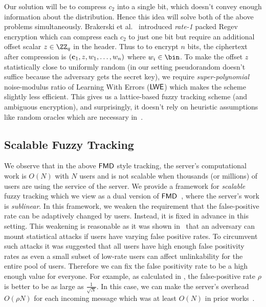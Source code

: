 Our solution will be to compress $c_2$ into a single bit, which doesn't convey enough information about the distribution. Hence this idea will solve both of the above problems simultaneously. Brakerski et al.~\cite{TCC:BDGM19} introduced \emph{rate-1} packed Regev encryption which can compress each $c_2$ to just one bit but require an additional offset scalar $z\in\ZZ_q$ in the header. Thus to to encrypt $n$ bits, the ciphertext after compression is $(\mathbf{c}_1,z,w_1,\dots,w_n)$ where $w_i\in\bin$.
To make the offset $z$ statistically close to uniformly random (in our setting pseudorandom doesn't suffice because the adversary gets the secret key), we require \emph{super-polynomial} noise-modulus ratio of Learning With Errors ($\mathsf{LWE}$)\cite{STOC:Regev05} which makes the scheme slightly less efficient. 
This gives us a lattice-based fuzzy tracking scheme (and ambiguous encryption), and surprisingly, it doesn't rely on heuristic assumptions like random oracles which are necessary in~\cite{CCS:BLMG21}. 


\subsection{Scalable Fuzzy Tracking}
\label{sec:tech_scalable_fuzzy}
We observe that in the above $\mathsf{FMD}$ style tracking, the server's computational work is $O(N)$ with $N$ users and is not scalable when thousands (or millions) of users are using the service of the server.
We provide a framework for \emph{scalable} fuzzy tracking which we view as a dual version of $\mathsf{FMD}$~\cite{CCS:BLMG21}, where the server's work is \emph{sublinear}. In this framework, we weaken the requirement that the false-positive rate can be adaptively changed by users. Instead, it is fixed in advance in this setting. 
This weakening is reasonable as it was shown in~\cite{EPRINT:SerPejBur21} that an adversary can mount statistical attacks if users have varying false positive rates.
To circumvent such attacks it was suggested that all users have high enough false positivity rates as even a small subset of low-rate users can affect unlinkability for the entire pool of users.
Therefore we can fix the false positivity rate to be a high enough value for everyone. For example, as calculated in \cite{EPRINT:SerPejBur21}, the false-positive rate $\rho$ is better to be as large as $\frac{1}{\sqrt{N}}$.
In this case, we can make the server's overhead $O(\rho N)$ for each incoming message which was at least $O(N)$ in prior works~\cite{CCS:BLMG21,USENIX:MSSSV22,C:LiuTro22}.



